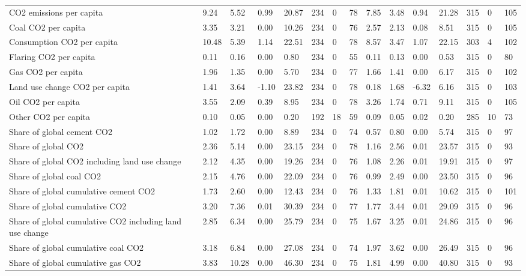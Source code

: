 \begin{longtable}{lllllllllllllll}
CO2 emissions per capita & 9.24 & 5.52 & 0.99 & 20.87 & 234 & 0 & 78 & 7.85 & 3.48 & 0.94 & 21.28 & 315 & 0 & 105\\
Coal CO2 per capita & 3.35 & 3.21 & 0.00 & 10.26 & 234 & 0 & 76 & 2.57 & 2.13 & 0.08 & 8.51 & 315 & 0 & 105\\
Consumption CO2 per capita & 10.48 & 5.39 & 1.14 & 22.51 & 234 & 0 & 78 & 8.57 & 3.47 & 1.07 & 22.15 & 303 & 4 & 102\\
\addlinespace
Flaring CO2 per capita & 0.11 & 0.16 & 0.00 & 0.80 & 234 & 0 & 55 & 0.11 & 0.13 & 0.00 & 0.53 & 315 & 0 & 80\\
Gas CO2 per capita & 1.96 & 1.35 & 0.00 & 5.70 & 234 & 0 & 77 & 1.66 & 1.41 & 0.00 & 6.17 & 315 & 0 & 102\\
Land use change CO2 per capita & 1.41 & 3.64 & -1.10 & 23.82 & 234 & 0 & 78 & 0.18 & 1.68 & -6.32 & 6.16 & 315 & 0 & 103\\
Oil CO2 per capita & 3.55 & 2.09 & 0.39 & 8.95 & 234 & 0 & 78 & 3.26 & 1.74 & 0.71 & 9.11 & 315 & 0 & 105\\
Other CO2 per capita & 0.10 & 0.05 & 0.00 & 0.20 & 192 & 18 & 59 & 0.09 & 0.05 & 0.02 & 0.20 & 285 & 10 & 73\\
\addlinespace
Share of global cement CO2 & 1.02 & 1.72 & 0.00 & 8.89 & 234 & 0 & 74 & 0.57 & 0.80 & 0.00 & 5.74 & 315 & 0 & 97\\
Share of global CO2 & 2.36 & 5.14 & 0.00 & 23.15 & 234 & 0 & 78 & 1.16 & 2.56 & 0.01 & 23.57 & 315 & 0 & 93\\
Share of global CO2 including land use change & 2.12 & 4.35 & 0.00 & 19.26 & 234 & 0 & 76 & 1.08 & 2.26 & 0.01 & 19.91 & 315 & 0 & 97\\
Share of global coal CO2 & 2.15 & 4.76 & 0.00 & 22.09 & 234 & 0 & 76 & 0.99 & 2.49 & 0.00 & 23.50 & 315 & 0 & 96\\
Share of global cumulative cement CO2 & 1.73 & 2.60 & 0.00 & 12.43 & 234 & 0 & 76 & 1.33 & 1.81 & 0.01 & 10.62 & 315 & 0 & 101\\
\addlinespace
Share of global cumulative CO2 & 3.20 & 7.36 & 0.01 & 30.39 & 234 & 0 & 77 & 1.77 & 3.44 & 0.01 & 29.09 & 315 & 0 & 96\\
Share of global cumulative CO2 including land use change & 2.85 & 6.34 & 0.00 & 25.79 & 234 & 0 & 75 & 1.67 & 3.25 & 0.01 & 24.86 & 315 & 0 & 96\\
Share of global cumulative coal CO2 & 3.18 & 6.84 & 0.00 & 27.08 & 234 & 0 & 74 & 1.97 & 3.62 & 0.00 & 26.49 & 315 & 0 & 96\\
Share of global cumulative gas CO2 & 3.83 & 10.28 & 0.00 & 46.30 & 234 & 0 & 75 & 1.81 & 4.99 & 0.00 & 40.80 & 315 & 0 & 93\\

\end{longtable}
